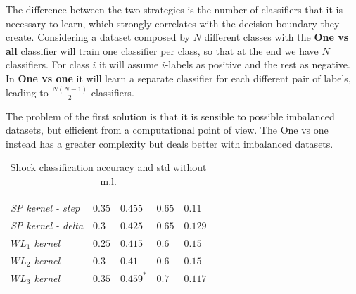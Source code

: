 \documentclass[11pt,a4paper]{article}
\begin{document}
The difference between the two strategies is the number of classifiers that it is necessary to learn, which strongly correlates with the decision boundary they create. Considering a dataset composed by $N$ different classes with the \textbf{One vs all} classifier will train one classifier per class, so that at the end we have $N$ classifiers. For class $i$ it will assume $i$-labels as positive and the rest as negative. In \textbf{One vs one} it will learn a separate classifier for each different pair of labels, leading to $\frac{N(N-1)}{2}$ classifiers.

The problem of the first solution is that it is sensible to possible imbalanced datasets, but efficient from a computational point of view. The One vs one instead has a greater complexity but deals better with imbalanced datasets.
\renewcommand{\arraystretch}{1.5}
\begin{table}[H]
	\centering
	\begin{tabularx}{\linewidth}{|Y|l|l|l|l|}
		 &  &  &  & \\
		
		\centering \textit{SP kernel - step} & $0.35$ & $0.455$ & $0.65$ & $0.11$\\
		
		\centering \textit{SP kernel - delta} & $0.3$ & $0.425$ & $0.65$ & $0.129$\\
		
		\centering \textit{$WL_1$ kernel} & $0.25$ & $0.415$ & $0.6$ & $0.15$\\
		
		\centering \textit{$WL_2$ kernel} & $0.3$ & $0.41$ & $0.6$ & $0.15$\\
		
		\centering \textit{$WL_3$ kernel} & $0.35$ & $\mathbf{0.459^*}$ & $0.7$ & $0.117$\\
		
	\end{tabularx}
		\caption{Shock classification accuracy and std without m.l.}
		\label{table:svmShock}
\end{table}
\renewcommand{\arraystretch}{1}
\end{document}
